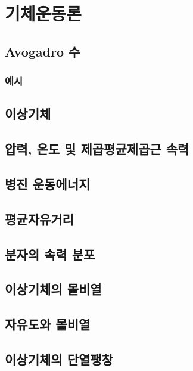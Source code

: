 
\chapter
{기체운동론}

\section
{Avogadro 수}

\subsection
{예시}

\section
{이상기체}

\section
{압력, 온도 및 제곱평균제곱근 속력}

\section
{병진 운동에너지}

\section
{평균자유거리}

\section
{분자의 속력 분포}

\section
{이상기체의 몰비열}

\section
{자유도와 몰비열}

\section
{이상기체의 단열팽창}